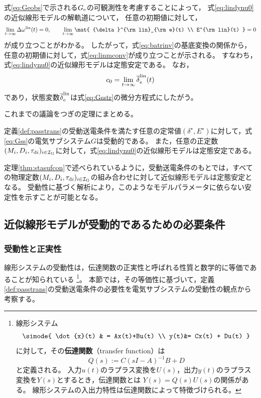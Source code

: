 \documentclass[tombow,dvipdfmx]{corona-a5-1.1}
\begin{document}
式\ref{eq:Geobs}で示される$G_{\rm e}$の可観測性を考慮することによって，
式\ref{eq:lindynu0}の近似線形モデルの解軌道について，
任意の初期値に対して，
\begin{align}\label{eq:allzero}
\lim_{t\rightarrow \infty} \Delta \omega^{\rm lin}(t)  =0,\qquad
\lim_{t\rightarrow \infty} \mat{
{\delta}^{\rm lin}_{\rm e}(t)   \\
E^{\rm lin}(t)  
}
 =0
\end{align}
が成り立つことがわかる。
したがって，式\ref{eq:batrinv}の基底変換の関係から，任意の初期値に対して，式\ref{eq:linmconv}が成り立つことが示される。
すなわち，式\ref{eq:lindynu0}の近似線形モデルは定態安定である。
なお，
\[
c_0 = \lim_{t\rightarrow \infty}\overline{\delta}^{\rm lin}_{\rm e}(t)
\]
であり，状態変数$\overline{\delta}^{\rm lin}_{\rm e}$は式\ref{eq:Gsstr}の微分方程式にしたがう。

これまでの議論をつぎの定理にまとめる。

\begin{定理}[受動性に基づく近似線形モデルの定態安定性]\label{thm:stasufcon}
定義\ref{def:passtrans}の受動送電条件を満たす任意の定常値$(\delta^{\star},E^{\star})$に対して，式\ref{eq:Gss}の電気サブシステム$G$は受動的である。
また，任意の正定数$(M_i,D_i,\tau_{{\rm d}i})_{i \in \mathcal{I}_{\rm G}}$に対して，式\ref{eq:lindynu0}の近似線形モデルは定態安定である。
\end{定理}

定理\ref{thm:stasufcon}で述べられているように，受動送電条件のもとでは，すべての物理定数$(M_i,D_i,\tau_{{\rm d}i})_{i \in \mathcal{I}_{\rm G}}$の組み合わせに対して近似線形モデルは定態安定となる。
受動性に基づく解析により，このようなモデルパラメータに依らない安定性を示すことが可能となる。


\subsection{近似線形モデルが受動的であるための必要条件\advanced}\label{sec:nesconana}

\subsubsection{受動性と正実性}

線形システムの受動性は，伝達関数の正実性と呼ばれる性質と数学的に等価であることが知られている
\footnote{
線形システム
\begin{align*}
\simode{
\dot{x}(t) & = Ax(t)+Bu(t) \\
y(t)&= Cx(t) + Du(t)
}
\end{align*}
に対して，その\textbf{伝達関数}（transfer function）は
\[
Q(s):=C(sI-A)^{-1}B +D
\]
と定義される。
入力$u(t)$のラプラス変換を$U(s)$，出力$y(t)$のラプラス変換を$Y(s)$とするとき，伝達関数とは
$Y(s)=Q(s)U(s)$の関係がある。
線形システムの入出力特性は伝達関数によって特徴づけられる。
}。
本節では，その等価性に基づいて，定義\ref{def:passtrans}の受動送電条件の必要性を電気サブシステムの受動性の観点から考察する。
\end{document}
